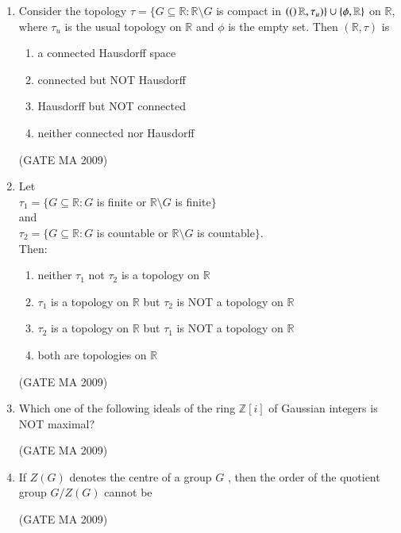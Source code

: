\documentclass[journal,12pt,onecolumn]{IEEEtran}
\theoremstyle{remark}
\begin{document}
\begin{enumerate}[leftmargin=0pt, align=left, start=21]
\item Consider the topology $\tau=\{G\subseteq \mathbb{R} : \mathbb{R}\setminus G$ is compact in $\left((\right)\mathbb{R},\tau_u)\}\cup\{\phi,\mathbb{R}\}$ on $\mathbb{R}$, where $\tau_u$ is the usual topology on $\mathbb{R}$ and $\phi$ is the empty set. Then $(\mathbb{R},\tau)$ is
\begin{enumerate}
    \item a connected Hausdorff space
    \item connected but NOT Hausdorff
    \item Hausdorff but NOT connected
    \item neither connected nor Hausdorff
\end{enumerate}
\hfill (GATE MA 2009)

\item Let \\ $\tau_1=\{G\subseteq\mathbb{R}:G$ is finite or $\mathbb{R}\setminus G$ is finite$\}$\\ and \\ $\tau_2=\{G\subseteq \mathbb{R}:G$ is countable or $\mathbb{R}\setminus G$ is countable$\}$. \\
Then:
\begin{enumerate}
    \item neither $\tau_1$ not $\tau_2$ is a topology on $\mathbb{R}$
    \item $\tau_1$ is a topology on $\mathbb{R}$ but $\tau_2$ is NOT a topology on $\mathbb{R}$
    \item $\tau_2$ is a topology on $\mathbb{R}$ but $\tau_1$ is NOT a topology on $\mathbb{R}$
    \item both are topologies on $\mathbb{R}$
\end{enumerate}
\hfill (GATE MA 2009)

\item Which one of the following ideals of the ring $\mathbb{Z}[i]$ of Gaussian integers is NOT maximal?
\begin{enumerate}
\end{enumerate}
\hfill (GATE MA 2009)

\item If $Z(G)$ denotes the centre of a group $G$ , then the order of the quotient group $G/Z(G)$ cannot be
\begin{enumerate}
\end{enumerate}
\hfill (GATE MA 2009)


\end{enumerate}
\end{document}
